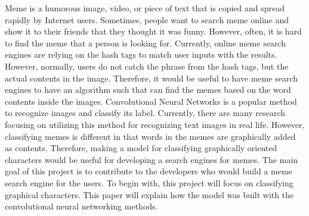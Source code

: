 Meme is a humorous image, video,
or piece of text that is copied and spread
rapidly by Internet users. Sometimes, people
want to search meme online and show it to their
friends that they thought it was funny. However,
often, it is hard to find the meme that a person
is looking for. Currently, online meme search engines are
relying on the hash tags to match user inputs with the results.
However, normally, users do not catch the phrase from the
hash tags, but the actual contents in the image. Therefore, it
would be useful to have meme search engines to have
an algorithm such that can find the memes based on the word contents
inside the images.
\newline
\newline
\indent
Convolutional Neural Networks is a popular method to recognize images and
classify its label. Currently, there are many research focusing on utilizing
this method for recognizing text images in real life. However, classifying
memes is different in that words in the memes are graphically added as contents.
Therefore, making a model for classifying graphically oriented characters
would be useful for developing a search engines for memes.
\newline
\newline
\indent
The main goal of this project is to contribute to the developers who
would build a meme search engine for the users. To begin with, this project
will focus on classifying graphical characters. This paper will explain how
the model was built with the convolutional neural networking methods.
